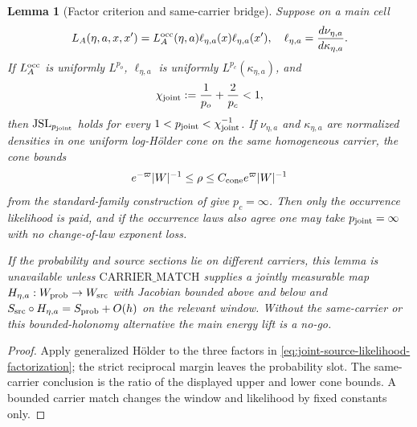 \documentclass[11pt]{article}
\newtheorem{lemma}[theorem]{Lemma}
\begin{document}
\begin{lemma}[Factor criterion and same-carrier bridge]
\label{lem:joint-source-factor-criterion}
Suppose on a main cell
\begin{equation}
\label{eq:joint-source-likelihood-factorization}
 L_A(\eta,a,x,x')=
 L_A^{\rm occ}(\eta,a)\ell_{\eta,a}(x)\ell_{\eta,a}(x'),
 \quad
 \ell_{\eta,a}=\frac{d\nu_{\eta,a}}{d\kappa_{\eta,a}}.
\end{equation}
If $L_A^{\rm occ}$ is uniformly $L^{p_o}$,
$\ell_{\eta,a}$ is uniformly $L^{p_c}(\kappa_{\eta,a})$, and
\begin{equation}
\label{eq:joint-source-reciprocal-margin}
 \chi_{\rm joint}:=\frac1{p_o}+\frac2{p_c}<1,
\end{equation}
then $\mathrm{JSL}_{p_{\rm joint}}$ holds for every
$1<p_{\rm joint}<\chi_{\rm joint}^{-1}$.
If $\nu_{\eta,a}$ and $\kappa_{\eta,a}$ are normalized densities in one
uniform log-H\"older cone on the same homogeneous carrier, the cone bounds
\[
 e^{-\varpi}|W|^{-1}\le\rho\le
 C_{\rm cone}e^{\varpi}|W|^{-1}
\]
from the standard-family construction of \cite{CanestrariHoles} give
$p_c=\infty$.  Then only the occurrence likelihood is paid, and if the
occurrence laws also agree one may take $p_{\rm joint}=\infty$ with no
change-of-law exponent loss.

If the probability and source sections lie on different carriers, this
lemma is unavailable unless $\mathrm{CARRIER\_MATCH}$ supplies a jointly
measurable map $H_{\eta,a}:W_{\rm prob}\to W_{\rm src}$ with Jacobian bounded
above and below and
$S_{\rm src}\circ H_{\eta,a}=S_{\rm prob}+O(h)$ on the relevant window.
Without the same-carrier or this bounded-holonomy alternative the main energy
lift is a no-go.
\end{lemma}

\begin{proof}
Apply generalized H\"older to the three factors in
\eqref{eq:joint-source-likelihood-factorization}; the strict reciprocal
margin leaves the probability slot.  The same-carrier conclusion is the
ratio of the displayed upper and lower cone bounds.  A bounded carrier match
changes the window and likelihood by fixed constants only.
\end{proof}
\end{document}

